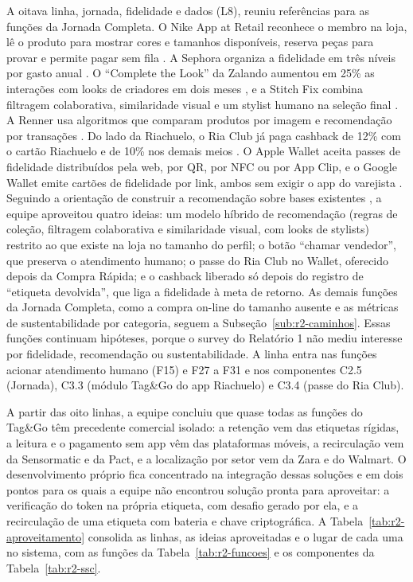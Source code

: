 A oitava linha, jornada, fidelidade e dados (L8), reuniu referências para as funções da Jornada Completa. O Nike App at Retail reconhece o membro na loja, lê o produto para mostrar cores e tamanhos disponíveis, reserva peças para provar e permite pagar sem fila \cite{marketingdive2018nike}. A Sephora organiza a fidelidade em três níveis por gasto anual \cite{modernretail2024sephora}. O ``Complete the Look'' da Zalando aumentou em 25\% as interações com looks de criadores em dois meses \cite{zalando2021looks}, e a Stitch Fix combina filtragem colaborativa, similaridade visual e um stylist humano na seleção final \cite{stitchfix2026algoritmos}. A Renner usa algoritmos que comparam produtos por imagem e recomendação por transações \cite{infomoney2024renner}. Do lado da Riachuelo, o Ria Club já paga cashback de 12\% com o cartão Riachuelo e de 10\% nos demais meios \cite{midway2026riaclub}. O Apple Wallet aceita passes de fidelidade distribuídos pela web, por QR, por NFC ou por App Clip, e o Google Wallet emite cartões de fidelidade por link, ambos sem exigir o app do varejista \cite{apple2026walletpass,google2026walletfidelidade}. Seguindo a orientação de construir a recomendação sobre bases existentes \cite{zancul2026conceitual}, a equipe aproveitou quatro ideias: um modelo híbrido de recomendação (regras de coleção, filtragem colaborativa e similaridade visual, com looks de stylists) restrito ao que existe na loja no tamanho do perfil; o botão ``chamar vendedor'', que preserva o atendimento humano; o passe do Ria Club no Wallet, oferecido depois da Compra Rápida; e o cashback liberado só depois do registro de ``etiqueta devolvida'', que liga a fidelidade à meta de retorno. As demais funções da Jornada Completa, como a compra on-line do tamanho ausente e as métricas de sustentabilidade por categoria, seguem a Subseção~\ref{sub:r2-caminhos}. Essas funções continuam hipóteses, porque o survey do Relatório 1 não mediu interesse por fidelidade, recomendação ou sustentabilidade. A linha entra nas funções acionar atendimento humano (F15) e F27 a F31 e nos componentes C2.5 (Jornada), C3.3 (módulo Tag\&Go do app Riachuelo) e C3.4 (passe do Ria Club).

A partir das oito linhas, a equipe concluiu que quase todas as funções do Tag\&Go têm precedente comercial isolado: a retenção vem das etiquetas rígidas, a leitura e o pagamento sem app vêm das plataformas móveis, a recirculação vem da Sensormatic e da Pact, e a localização por setor vem da Zara e do Walmart. O desenvolvimento próprio fica concentrado na integração dessas soluções e em dois pontos para os quais a equipe não encontrou solução pronta para aproveitar: a verificação do token na própria etiqueta, com desafio gerado por ela, e a recirculação de uma etiqueta com bateria e chave criptográfica. A Tabela~\ref{tab:r2-aproveitamento} consolida as linhas, as ideias aproveitadas e o lugar de cada uma no sistema, com as funções da Tabela~\ref{tab:r2-funcoes} e os componentes da Tabela~\ref{tab:r2-ssc}.

